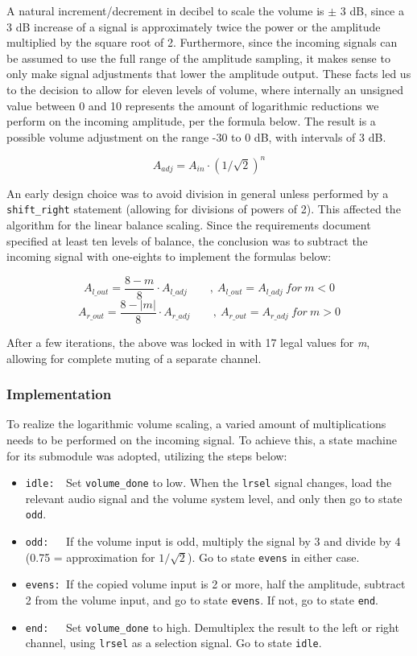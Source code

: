 A natural increment/decrement in decibel to scale the volume is $\pm$ 3 dB, since a 3 dB increase of a signal is approximately twice the power or the amplitude multiplied by the square root of 2. Furthermore, since the incoming signals can be assumed to use the full range of the amplitude sampling, it makes sense to only make signal adjustments that lower the amplitude output. These facts led us to the decision to allow for eleven levels of volume, where internally an unsigned value between 0 and 10 represents the amount of logarithmic reductions we perform on the incoming amplitude, per the formula below. The result is a possible volume adjustment on the range -30 to 0 dB, with intervals of 3 dB.
	
$$A_{adj} = A_{in} \cdot (1/\sqrt{2})^n$$

An early design choice was to avoid division in general unless performed by a \texttt{shift\_right} statement (allowing for divisions of powers of 2). This affected the algorithm for the linear balance scaling. Since the requirements document specified at least ten levels of balance, the conclusion was to subtract the incoming signal with one-eights to implement the formulas below:
	
$$A_{l\_out} = \frac{8 - m}{8} \cdot A_{l\_adj}\qquad,\ A_{l\_out} = A_{l\_adj}\ for\ m < 0$$
$$A_{r\_out} = \frac{8 - |m|}{8} \cdot A_{r\_adj}\qquad,\ A_{r\_out} = A_{r\_adj}\ for\ m > 0$$
	
After a few iterations, the above was locked in with 17 legal values for \emph{m}, allowing for complete muting of a separate channel.
	
	
\subsubsection{Implementation}

To realize the logarithmic volume scaling, a varied amount of multiplications needs to be performed on the incoming signal. To achieve this, a state machine for its submodule was adopted, utilizing the steps below:

\begin{itemize}
\item \verb=idle:  =Set \texttt{volume\_done} to low. When the \texttt{lrsel} signal changes, load the relevant audio signal and the volume system level, and only then go to state \texttt{odd}.
\item \verb=odd:   =If the volume input is odd, multiply the signal by 3 and divide by 4 (0.75 = approximation for $1/\sqrt{2}$). Go to state \texttt{evens} in either case.
\item \verb=evens: =If the copied volume input is 2 or more, half the amplitude, subtract 2 from the volume input, and go to state \texttt{evens}. If not, go to state \texttt{end}.
\item \verb=end:   =Set \texttt{volume\_done} to high. Demultiplex the result to the left or right channel, using \texttt{lrsel} as a selection signal. Go to state \texttt{idle}.
\end{itemize} 

